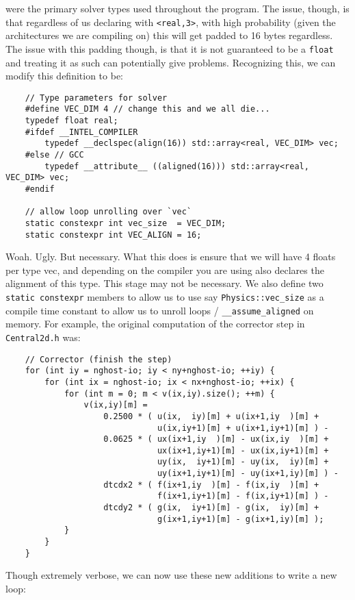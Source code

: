 were the primary solver types used throughout the program.  The issue, though, is that regardless of us declaring with \texttt{<real,3>}, with high probability (given the architectures we are compiling on) this will get padded to 16 bytes regardless.  The issue with this padding though, is that it is not guaranteed to be a \texttt{float} and treating it as such can potentially give problems.  Recognizing this, we can modify this definition to be:

{\tiny
\begin{lstlisting}
    // Type parameters for solver
    #define VEC_DIM 4 // change this and we all die...
    typedef float real;
    #ifdef __INTEL_COMPILER
        typedef __declspec(align(16)) std::array<real, VEC_DIM> vec;
    #else // GCC
        typedef __attribute__ ((aligned(16))) std::array<real, VEC_DIM> vec;
    #endif

    // allow loop unrolling over `vec`
    static constexpr int vec_size  = VEC_DIM;
    static constexpr int VEC_ALIGN = 16;
\end{lstlisting}
}

Woah.  Ugly.  But necessary.  What this does is ensure that we will have 4 floats per type vec, and depending on the compiler you are using also declares the alignment of this type.  This stage may not be necessary.  We also define two \texttt{static constexpr} members to allow us to use say \texttt{Physics::vec\_size} as a compile time constant to allow us to unroll loops / \texttt{\_\_assume\_aligned} on memory.  For example, the original computation of the corrector step in \texttt{Central2d.h} was:
{\tiny
\begin{lstlisting}
    // Corrector (finish the step)
    for (int iy = nghost-io; iy < ny+nghost-io; ++iy) {
        for (int ix = nghost-io; ix < nx+nghost-io; ++ix) {
            for (int m = 0; m < v(ix,iy).size(); ++m) {
                v(ix,iy)[m] =
                    0.2500 * ( u(ix,  iy)[m] + u(ix+1,iy  )[m] +
                               u(ix,iy+1)[m] + u(ix+1,iy+1)[m] ) -
                    0.0625 * ( ux(ix+1,iy  )[m] - ux(ix,iy  )[m] +
                               ux(ix+1,iy+1)[m] - ux(ix,iy+1)[m] +
                               uy(ix,  iy+1)[m] - uy(ix,  iy)[m] +
                               uy(ix+1,iy+1)[m] - uy(ix+1,iy)[m] ) -
                    dtcdx2 * ( f(ix+1,iy  )[m] - f(ix,iy  )[m] +
                               f(ix+1,iy+1)[m] - f(ix,iy+1)[m] ) -
                    dtcdy2 * ( g(ix,  iy+1)[m] - g(ix,  iy)[m] +
                               g(ix+1,iy+1)[m] - g(ix+1,iy)[m] );
            }
        }
    }
\end{lstlisting}
}
Though extremely verbose, we can now use these new additions to write a new loop:

